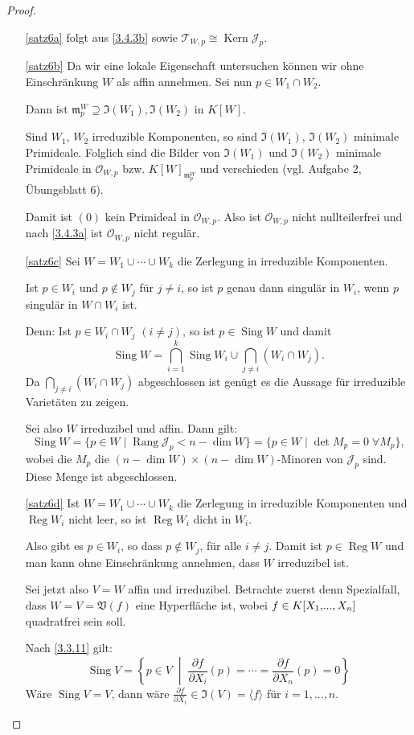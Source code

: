 \documentclass[a4paper,12pt,index=toc]{scrbook}
\theoremstyle{keinenummern} %
\def\V{\mathfrak{V}}
\def\I{\mathfrak{I}}
\def\O{\mathcal{O}}
\newcommand{\J}{\mathcal{J}}
\def\T{\mathcal{T}}
\def\m{\mathfrak{m}}
\newcommand{\Kern}{\operatorname{Kern}}
\newcommand{\Rang}{\operatorname{Rang}}
\newcommand{\Sing}{\operatorname{Sing}}
\newcommand{\Reg}{\operatorname{Reg}}
\renewcommand{\dotsc}{\ensuremath{\!...}}
\newcommand{\polyx}[1][n]{\ensuremath%
  [X_{1},\dotsc,X_{#1}]}
\begin{document}
\begin{proof}
  \begin{enumerate}
  \item[\ref{satz6a}] folgt aus \cref{3.4.3b} sowie $\T_{W,p}\cong \Kern \J_p$.
  \item[\ref{satz6b}] Da wir eine lokale Eigenschaft untersuchen können wir ohne Einschränkung $W$ als affin annehmen. Sei nun $p\in W_1\cap W_2$.

  Dann ist $\m_p^W\supseteq \I(W_1),\I(W_2)$ in $K[W]$.

  Sind $W_1$, $W_2$ irreduzible Komponenten, so sind $\I(W_1)$, $\I(W_2)$ minimale Primideale. Folglich sind die Bilder von $\I(W_1)$ und $\I(W_2)$ minimale Primideale in $\O_{W,p}$ bzw. $K[W]_{\m_p^W}$ und verschieden (vgl. Aufgabe 2, Übungsblatt 6).

  Damit ist $(0)$ kein Primideal in $\O_{W,p}$. Also ist $\O_{W,p}$ nicht nullteilerfrei und nach \cref{3.4.3a} ist $\O_{W,p}$ nicht regulär.
  \item[\ref{satz6c}] Sei $W=W_1\cup \dotsm \cup W_k$ die Zerlegung in irreduzible Komponenten.

  Ist $p\in W_i$ und $p\notin W_j$ für $j\neq i$, so ist $p$ genau dann singulär in $W_i$, wenn $p$ singulär in $W\cap W_i$ ist.

 Denn: Ist $p\in W_i\cap W_j$ $(i\neq j)$, so ist $p \in \Sing W$ und damit
\[\Sing W=\bigcap\limits_{i=1}^{k} \Sing W_i \cup \bigcap\limits_{j\neq i}^{}(W_i\cap W_j).\]
Da $  \bigcap\limits_{j\neq i}^{}(W_i\cap W_j)$ abgeschlossen ist genügt es die Aussage für irreduzible Varietäten zu zeigen. 

Sei also $W$ irreduzibel und affin. Dann gilt:
\[\Sing W=\{p\in W \mid \Rang \J_p < n-\dim W\}=\{p\in W \mid \det M_p=0\;\forall M_{p}\},\]
wobei die $M_{p}$ die $(n-\dim W)\times (n-\dim W)$-Minoren von $\J_p$ sind. Diese Menge ist abgeschlossen.
  \item[\ref{satz6d}] Ist $W=W_1\cup \dotsm \cup W_k$ die Zerlegung in irreduzible Komponenten und $\Reg W_i$ nicht leer, so ist $\Reg W_i$ dicht in $W_i$.

Also gibt es $p\in W_i$, so dass $p\notin W_j$, für alle $i\neq j$. Damit ist $p\in \Reg W$ und man kann ohne Einschränkung annehmen, dass $W$ irreduzibel ist.

Sei jetzt also $V=W$ affin und irreduzibel. Betrachte zuerst denn Spezialfall, dass $W=V=\V(f)$ eine Hyperfläche ist, wobei $f\in K\polyx$ quadratfrei sein soll.

Nach \cref{3.3.11} gilt:\[\Sing V=\left\{p\in V\;\middle|\; \frac{\partial f}{\partial X_i}(p)=\dotsm=\frac{\partial f}{\partial X_n}(p)=0\right\}\]
Wäre $\Sing V=V$, dann wäre $\frac{\partial f}{\partial X_i}\in \I(V)=\langle f\rangle$ für $i=1,\dotsc,n$.


\end{enumerate}
\end{proof}
\end{document}
